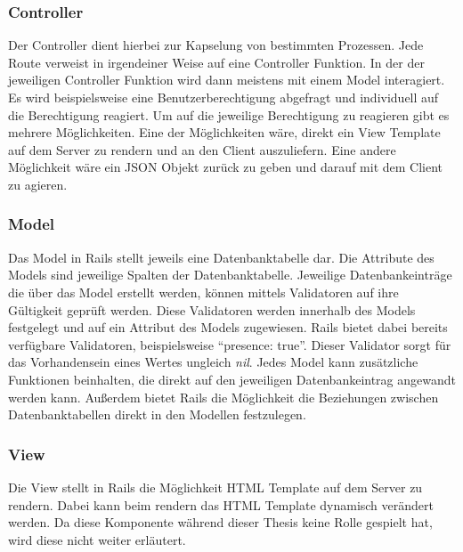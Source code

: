 \begin{minipage}{\linewidth}
	
\end{minipage}

\subsubsection{Controller}
\label{sec: rails_controller}
Der Controller dient hierbei zur Kapselung von bestimmten Prozessen. Jede Route verweist in irgendeiner Weise auf eine Controller Funktion. In der der jeweiligen Controller Funktion wird dann meistens mit einem Model interagiert. Es wird beispielsweise eine Benutzerberechtigung abgefragt und individuell auf die Berechtigung reagiert. Um auf die jeweilige Berechtigung zu reagieren gibt es mehrere Möglichkeiten. Eine der Möglichkeiten wäre, direkt ein View Template auf dem Server zu rendern und an den Client auszuliefern. Eine andere Möglichkeit wäre ein \gls{JSON} Objekt zurück zu geben und darauf mit dem Client zu agieren.

\subsubsection{Model}
\label{sec: rails_model}
Das Model in Rails stellt jeweils eine Datenbanktabelle dar. Die Attribute des Models sind jeweilige Spalten der Datenbanktabelle. Jeweilige Datenbankeinträge die über das Model erstellt werden, können mittels Validatoren auf ihre Gültigkeit geprüft werden. Diese Validatoren werden innerhalb des Models festgelegt und auf ein Attribut des Models zugewiesen. Rails bietet dabei bereits verfügbare Validatoren, beispielsweise \enquote{presence: true}. Dieser Validator sorgt für das Vorhandensein eines Wertes ungleich \textit{nil}. Jedes Model kann zusätzliche Funktionen beinhalten, die direkt auf den jeweiligen Datenbankeintrag angewandt werden kann. Außerdem bietet Rails die Möglichkeit die Beziehungen zwischen Datenbanktabellen direkt in den Modellen festzulegen.

\subsubsection{View}
\label{sec: rails_view}
Die View stellt in Rails die Möglichkeit \gls{HTML} Template auf dem Server zu rendern. Dabei kann beim rendern das \gls{HTML} Template dynamisch verändert werden. Da diese Komponente während dieser Thesis keine Rolle gespielt hat, wird diese nicht weiter erläutert.

